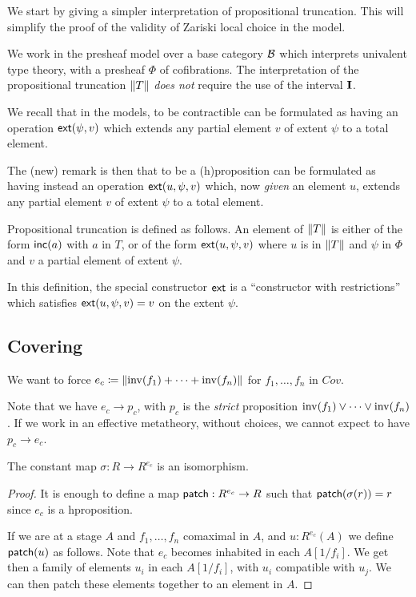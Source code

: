     We start by giving a simpler interpretation of propositional truncation. This will simplify
    the proof of the validity of Zariski local choice in the model.

    We work in the presheaf model over a base category $\mathcal{B}$ which interprets univalent type theory,
    with a presheaf $\Phi$ of cofibrations. The interpretation of the propositional
    truncation $\left\lVert T \right\rVert$ {\em does not} require the use of the interval $\mathbf{I}$.

    We recall that in the models, to be contractible can be formulated as having an operation
    $\mathsf{ext}(\psi,v)$ which extends any partial element $v$ of extent $\psi$ to a total element.

    The (new) remark is then that to be a (h)proposition can be formulated as having instead
    an operation $\mathsf{ext}(u,\psi,v)$ which, now {\em given}
    an element $u$, extends any partial element $v$ of extent $\psi$ to a total element.

\medskip    

Propositional truncation is defined as follows. An element of $\left\lVert T \right\rVert$ is either of the form
$\mathsf{inc}(a)$ with $a$ in $T$, or of the form $\mathsf{ext}(u,\psi,v)$ where $u$ is in $\left\lVert T \right\rVert$ and $\psi$
in $\Phi$ and $v$ a partial element of extent $\psi$.

In this definition, the special constructor $\mathsf{ext}$ is a ``constructor with restrictions'' which
satisfies $\mathsf{ext}(u,\psi,v) = v$ on the extent $\psi$.

\subsection{Covering}

We want to force $e_c \coloneqq \left\lVert \mathrm{inv}(f_1)+\dots+\mathrm{inv}(f_n) \right\rVert$ for $f_1,\dots,f_n$ in $Cov$.

Note that we have $e_c\rightarrow p_c$, with $p_c$ is the {\em strict} proposition $\mathrm{inv}(f_1)\vee \dots\vee\mathrm{inv}(f_n)$.
If we work in an effective metatheory, without choices, we cannot expect to have $p_c\rightarrow e_c$.

\begin{lemma}
  The constant map $\sigma:R\rightarrow R^{e_c}$ is an isomorphism.
\end{lemma}

\begin{proof}
  It is enough to define a map $\mathsf{patch}:R^{e_c}\rightarrow R$ such that $\mathsf{patch}(\sigma(r)) = r$ since
  $e_c$ is a hproposition.

  If we are at a stage $A$ and $f_1,\dots,f_n$ comaximal in $A$, and $u:R^{e_c}(A)$ we define $\mathsf{patch}(u)$ as follows.
  Note that $e_c$ becomes inhabited in each $A[1/f_i]$. We get then a family of elements $u_i$ in each $A[1/f_i]$, with $u_i$ compatible
  with $u_j$. We can then patch these elements together to an element in $A$.
\end{proof}


